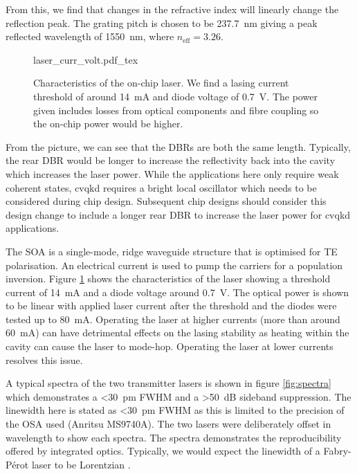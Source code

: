 From this, we find that changes in the refractive index will linearly change the reflection peak. The grating pitch is chosen to be \SI{237.7}{nm} giving a peak reflected wavelength of \SI{1550}{nm}, where $n_\text{eff} = 3.26$.

\begin{figure}[t]
	\centering
	\tiny
	\def\svgwidth{\textwidth} 
	{laser_curr_volt.pdf_tex}
	\caption[Lasing current threshold and voltage]{Characteristics of the on-chip laser. We find a lasing current threshold of around \SI{14}{mA} and diode voltage of \SI{0.7}{V}. The power given includes losses from optical components and fibre coupling so the on-chip power would be higher.}
	\label{fig:las_curr_volt}
\end{figure}

From the picture, we can see that the \acp{DBR} are both the same length. Typically, the rear \ac{DBR} would be longer to increase the reflectivity back into the cavity which increases the laser power. While the applications here only require weak coherent states, \ac{cvqkd} requires a bright local oscillator which needs to be considered during chip design. Subsequent chip designs should consider this design change to include a longer rear \ac{DBR} to increase the laser power for \ac{cvqkd} applications.

The \ac{SOA} is a single-mode, ridge waveguide structure that is optimised for TE polarisation. An electrical current is used to pump the carriers for a population inversion. Figure \ref{fig:las_curr_volt} shows the characteristics of the laser showing a threshold current of \SI{14}{\mA} and a diode voltage around \SI{0.7}{V}. The optical power is shown to be linear with applied laser current after the threshold and the diodes were tested up to \SI{80}{\mA}. Operating the laser at higher currents (more than around \SI{60}{\mA}) can have detrimental effects on the lasing stability as heating within the cavity can cause the laser to mode-hop. Operating the laser at lower currents resolves this issue.


A typical spectra of the two transmitter lasers is shown in figure \ref{fig:spectra} which demonstrates a \SI{<30}{pm} \ac{FWHM} and a \SI{>50}{dB} sideband suppression. The linewidth here is stated as \SI{<30}{pm} \ac{FWHM} as this is limited to the precision of the \ac{OSA} used (Anritsu MS9740A). The two lasers were deliberately offset in wavelength to show each spectra. The spectra demonstrates the reproducibility offered by integrated optics. Typically, we would expect the linewidth of a Fabry-P\'{e}rot laser to be Lorentzian \cite{Ismail16}. 

